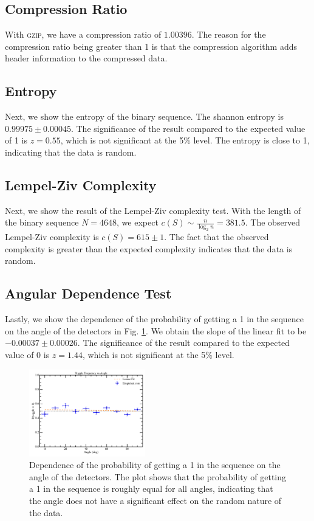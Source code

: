 \subsection{Compression Ratio}

With \textsc{gzip}, we have a compression ratio of $1.00396$. The reason for the compression ratio being greater than 1 is that the compression algorithm adds header information to the compressed data. 

\subsection{Entropy}

Next, we show the entropy of the binary sequence. The shannon entropy is $0.99975 \pm 0.00045$. The significance of the result compared to the expected value of 1 is $z=0.55$, which is not significant at the 5\% level. The entropy is close to 1, indicating that the data is random.

\subsection{Lempel-Ziv Complexity}

Next, we show the result of the Lempel-Ziv complexity test. With the length of the binary sequence $N=4648$, we expect $c(S) \sim \frac{n}{\log_2 n} = 381.5$. The observed Lempel-Ziv complexity is $c(S) = 615 \pm 1$. The fact that the observed complexity is greater than the expected complexity indicates that the data is random. 

\subsection{Angular Dependence Test}

Lastly, we show the dependence of the probability of getting a 1 in the sequence on the angle of the detectors in Fig. \ref{fig:angle_dependence}. We obtain the slope of the linear fit to be $-0.00037 \pm 0.00026$. The significance of the result compared to the expected value of 0 is $z=1.44$, which is not significant at the 5\% level. 

\begin{figure}
\centering
\includegraphics[width=0.45\textwidth]{figure/toggle_vs_angle.png}
\caption{Dependence of the probability of getting a 1 in the sequence on the angle of the detectors. The plot shows that the probability of getting a 1 in the sequence is roughly equal for all angles, indicating that the angle does not have a significant effect on the random nature of the data.}
\label{fig:angle_dependence}
\end{figure}

